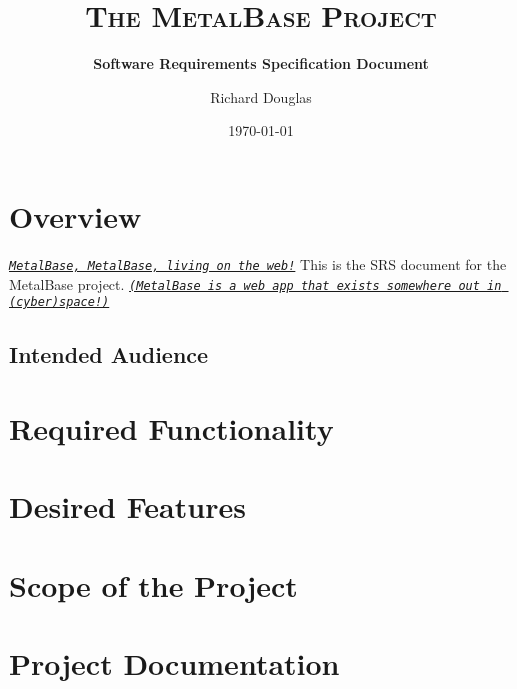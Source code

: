\documentclass{article}[12pt,a4paper]
\title{\textsc{The MetalBase Project}}
\subtitle{\textbf{Software Requirements Specification Document}}
\author{\Large{Richard Douglas}}
\date{\today{}}
\newcommand{\MetalVoice}[1]{\texttt{\textit{#1}}}
\begin{document}
  \maketitle
  
  \section*{Overview}
  \MetalVoice{\href{http://en.wikipedia.org/wiki/Kings_Of_Metal}{MetalBase, MetalBase, living on the web!}} 
  This is the SRS document for the MetalBase project.
  \MetalVoice{\href{http://en.wikipedia.org/wiki/Somewhere_Out_in_Space}{(MetalBase is a web app that exists somewhere out in (cyber)space!)}}
  
  \subsection*{Intended Audience}
  
  \tableofcontents
  
  \section{Required Functionality}
  
  \section{Desired Features}
  
  \section{Scope of the Project}
  
  \section{Project Documentation}
  
\end{document}
